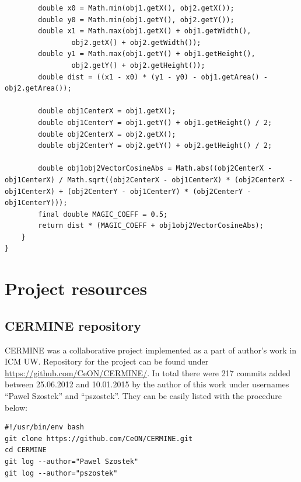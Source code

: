 \begin{appendix}
\begin{lstlisting}
        double x0 = Math.min(obj1.getX(), obj2.getX());
        double y0 = Math.min(obj1.getY(), obj2.getY());
        double x1 = Math.max(obj1.getX() + obj1.getWidth(),
                obj2.getX() + obj2.getWidth());
        double y1 = Math.max(obj1.getY() + obj1.getHeight(),
                obj2.getY() + obj2.getHeight());
        double dist = ((x1 - x0) * (y1 - y0) - obj1.getArea() - obj2.getArea());

        double obj1CenterX = obj1.getX();
        double obj1CenterY = obj1.getY() + obj1.getHeight() / 2;
        double obj2CenterX = obj2.getX();
        double obj2CenterY = obj2.getY() + obj2.getHeight() / 2;

        double obj1obj2VectorCosineAbs = Math.abs((obj2CenterX - obj1CenterX) / Math.sqrt((obj2CenterX - obj1CenterX) * (obj2CenterX - obj1CenterX) + (obj2CenterY - obj1CenterY) * (obj2CenterY - obj1CenterY)));
        final double MAGIC_COEFF = 0.5;
        return dist * (MAGIC_COEFF + obj1obj2VectorCosineAbs);
    }
}
\end{lstlisting}

\chapter{Project resources}
\label{app:resources}
\section{CERMINE repository}
CERMINE was a collaborative project implemented as a part of author's work in ICM UW. Repository for the project can be found under \url{https://github.com/CeON/CERMINE/}.
In total there were 217 commits added between 25.06.2012 and 10.01.2015 by the author of this work under usernames ``Pawel Szostek'' and ``pszostek''. They can be easily listed with the procedure below:
\begin{lstlisting}
#!/usr/bin/env bash
git clone https://github.com/CeON/CERMINE.git
cd CERMINE
git log --author="Pawel Szostek"
git log --author="pszostek"
\end{lstlisting}

\end{appendix}
